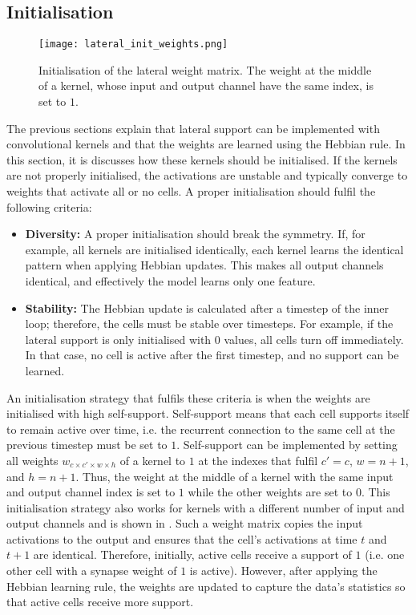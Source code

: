 \subsection{Initialisation}
\begin{figure}[h]
    \centering
    \texttt{[image: lateral\_init\_weights.png]}
    \caption[Initialisation of the lateral weight matrix]{Initialisation of the lateral weight matrix. The weight at the middle of a kernel, whose input and output channel have the same index, is set to $1$.}
\end{figure}
The previous sections explain that lateral support can be implemented with convolutional kernels and that the weights are learned using the Hebbian rule.
In this section, it is discusses how these kernels should be initialised.
If the kernels are not properly initialised, the activations are unstable and typically converge to weights that activate all or no cells.
A proper initialisation should fulfil the following criteria:

\begin{itemize}
    \item \textbf{Diversity:} A proper initialisation should break the symmetry. If, for example, all kernels are initialised identically, each kernel learns the identical pattern when applying Hebbian updates. This makes all output channels identical, and effectively the model learns only one feature.
    \item \textbf{Stability:} The Hebbian update is calculated after a timestep of the inner loop; therefore, the cells must be stable over timesteps. For example, if the lateral support is only initialised with $0$ values, all cells turn off immediately. In that case, no cell is active after the first timestep, and no support can be learned.
\end{itemize}

An initialisation strategy that fulfils these criteria is when the weights are initialised with high self-support.
Self-support means that each cell supports itself to remain active over time, i.e. the recurrent connection to the same cell at the previous timestep must be set to $1$.
Self-support can be implemented by setting all weights $w_{c \times c' \times w \times h}$ of a kernel to $1$ at the indexes that fulfil 
$c' = c$, $w = n+1$, and $h = n+1$. Thus, the weight at the middle of a kernel with the same input and output channel index is set to $1$ while the other weights are set to $0$. This initialisation strategy also works for kernels with a different number of input and output channels and is shown in .
Such a weight matrix copies the input activations to the output and ensures that the cell's activations at time $t$ and $t+1$ are identical. Therefore, initially, active cells receive a support of $1$ (i.e. one other cell with a synapse weight of $1$ is active).
However, after applying the Hebbian learning rule, the weights are updated to capture the data's statistics so that active cells receive more support.

